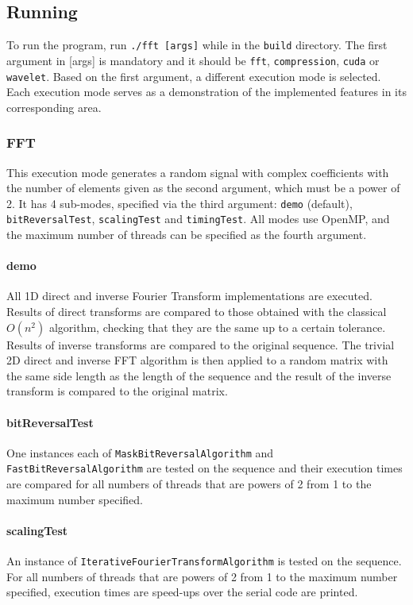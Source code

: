 \subsection{Running}
To run the program, run \texttt{./fft [args]} while in the \texttt{build} directory. The first argument in [args] is mandatory and it should be \texttt{fft}, \texttt{compression}, \texttt{cuda} or \texttt{wavelet}. Based on the first argument, a different execution mode is selected. Each execution mode serves as a demonstration of the implemented features in its corresponding area.

\subsubsection{FFT}
This execution mode generates a random signal with complex coefficients with the number of elements given as the second argument, which must be a power of 2. It has 4 sub-modes, specified via the third argument: \texttt{demo} (default), \texttt{bitReversalTest}, \texttt{scalingTest} and \texttt{timingTest}. All modes use OpenMP, and the maximum number of threads can be specified as the fourth argument.
\paragraph{demo} All 1D direct and inverse Fourier Transform implementations are executed. Results of direct transforms are compared to those obtained with the classical $O(n^2)$ algorithm, checking that they are the same up to a certain tolerance. Results of inverse transforms are compared to the original sequence. The trivial 2D direct and inverse FFT algorithm is then applied to a random matrix with the same side length as the length of the sequence and the result of the inverse transform is compared to the original matrix.
\paragraph{bitReversalTest} One instances each of \texttt{Mask\-Bit\-Reversal\-Algorithm} and \texttt{Fast\-Bit\-Reversal\-Algorithm} are tested on the sequence and their execution times are compared for all numbers of threads that are powers of 2 from 1 to the maximum number specified.
\paragraph{scalingTest} An instance of \texttt{Iterative\-Fourier\-Transform\-Algorithm} is tested on the sequence. For all numbers of threads that are powers of 2 from 1 to the maximum number specified, execution times are speed-ups over the serial code are printed.
